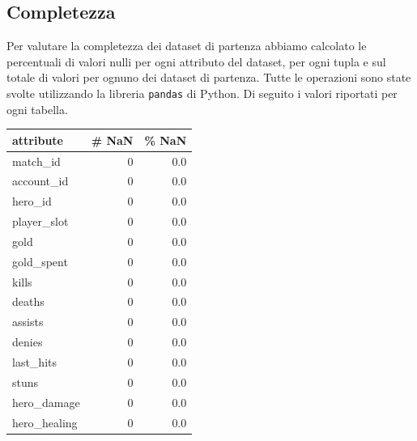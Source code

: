 \documentclass[a4paper,12pt,openany,oneside]{book}
\begin{document}
\subsection{Completezza}\label{subsection:completezza1}
Per valutare la completezza dei dataset di partenza abbiamo calcolato le percentuali di valori nulli per ogni attributo del dataset, per ogni tupla e sul totale di valori per ognuno dei dataset di partenza. Tutte le operazioni sono state svolte utilizzando la libreria \verb|pandas| di Python. Di seguito i valori riportati per ogni tabella.

\begin{table}[H]
	\tiny	
	\centering	
	\begin{tabularx}{0.37\textwidth}{lrr} 
		attribute                           &   \# NaN    &   \% NaN              \\
		\midrule
		match\_id                            &   0             &   0.0                    \\
		account\_id                          &   0             &   0.0                    \\
		hero\_id                             &   0             &   0.0                    \\
		player\_slot                         &   0             &   0.0                    \\
		gold                                &   0             &   0.0                    \\
		gold\_spent                          &   0             &   0.0                    \\
		kills                               &   0             &   0.0                    \\
		deaths                              &   0             &   0.0                    \\
		assists                             &   0             &   0.0                    \\
		denies                              &   0             &   0.0                    \\
		last\_hits                           &   0             &   0.0                    \\
		stuns                               &   0             &   0.0                    \\
		hero\_damage                         &   0             &   0.0                    \\
		hero\_healing                        &   0             &   0.0                    \\

\end{tabularx}
\end{table}
\end{document}
